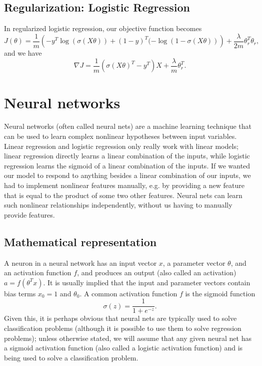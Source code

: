 \documentclass{article}
\begin{document}
\subsection{Regularization: Logistic Regression}
In regularized logistic regression, our objective function becomes
$$J(\theta) = \frac{1}{m}\left(-y^T\log(\sigma(X\theta)) + (1-y)^T(-\log(1-\sigma(X\theta))\right) + \frac{\lambda}{2m} \theta_r^T\theta_r,$$
and we have
$$\nabla J = \frac{1}{m}(\sigma(X\theta)^T - y^T)X + \frac{\lambda}{m} \theta_r^T.$$

\section{Neural networks}
Neural networks (often called neural nets) are a machine learning technique that can be used to learn complex nonlinear hypotheses between input variables. Linear regression and logistic regression only really work with linear models; linear regression directly learns a linear combination of the inputs, while logistic regression learns the sigmoid of a linear combination of the inputs. If we wanted our model to respond to anything besides a linear combination of our inputs, we had to implement nonlinear features manually, e.g. by providing a new feature that is equal to the product of some two other features. Neural nets can learn such nonlinear relationships independently, without us having to manually provide features.

\subsection{Mathematical representation}
A neuron in a neural network has an input vector $x$, a parameter vector $\theta$, and an activation function $f$, and produces an output (also called an activation) $a = f(\theta^Tx)$. It is usually implied that the input and parameter vectors contain bias terms $x_0=1$ and $\theta_0$. A common activation function $f$ is the sigmoid function
$$\sigma(z) = \frac{1}{1 + e^{-z}}.$$
Given this, it is perhaps obvious that neural nets are typically used to solve classification problems (although it is possible to use them to solve regression problems); unless otherwise stated, we will assume that any given neural net has a sigmoid activation function (also called a logistic activation function) and is being used to solve a classification problem.
\end{document}

